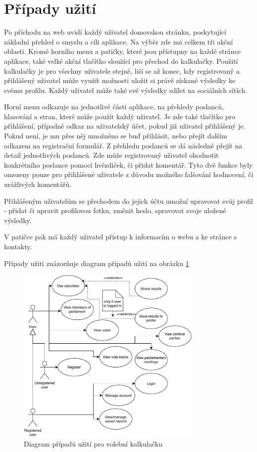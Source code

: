 \section{Případy užití}
Po příchodu na web uvidí každý uživatel domovskou stránku, poskytující základní přehled o smyslu a cíli aplikace. Na výběr zde má celkem tři akční oblasti. Kromě horního menu a patičky, které jsou přístupny na každé stránce aplikace, také velké akční tlačítko sloužící pro přechod do kalkulačky. Použití kalkulačky je pro všechny uživatele stejné, liší se až konec, kdy registrovaný a přihlášený uživatel může využít možnosti uložit si právě získané výsledky ke svému profilu. Každý uživatel může také své výsledky sdílet na sociálních sítích. 
\par Horní menu odkazuje na jednotlivé části aplikace, na přehledy poslanců, hlasování a stran, které může použít každý uživatel. Je zde také tlačítko pro přihlášení, případně odkaz na uživatelský účet, pokud již uživatel přihlášený je. Pokud není, je mu přes něj umožněno se buď přihlásit, nebo přejít dalším odkazem na registrační formulář. Z přehledu poslanců se dá následně přejít na detail jednotlivých poslanců. Zde může registrovaný uživatel ohodnotit konkrétního poslance pomocí hvězdiček, či přidat komentář. Tyto dvě funkce byly omezeny pouze pro přihlášené uživatele z důvodu možného falšování hodnocení, či urážlivých komentářů. 
\par Přihlášeným uživatelům se přechodem do jejich účtu umožní upravovat svůj profil - přidat či upravit profilovou fotku, změnit heslo, spravovat svoje uložené výsledky.
\par V patičce pak má každý uživatel přístup k informacím o webu a ke stránce s kontakty.

\par
Případy užití znázorňuje diagram případů užití na obrázku \ref{fig:diagram_uc}

\begin{figure}
    \centering
    \includegraphics[width=0.8\textwidth]{obrazky-figures/UC.pdf}
    \caption{Diagram případů užití pro volební kalkulačku}
    \label{fig:diagram_uc}
\end{figure}



